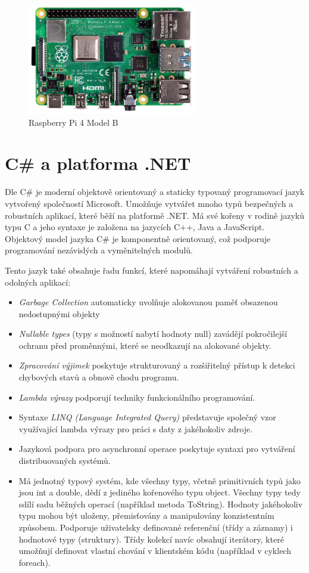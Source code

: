 \begin{figure}[hbt]
\centering
\includegraphics[width=0.66\textwidth]{obrazky-figures/raspberrypi.png}
\caption{Raspberry Pi 4 Model B}
\end{figure}

\section{C\# a platforma .NET}
Dle \cite{c_sharp} C\# je moderní objektově orientovaný a staticky typovaný programovací jazyk vytvořený společností Microsoft. Umožňuje vytvářet mnoho typů bezpečných a robustních aplikací, které běží na platformě .NET. Má své kořeny v rodině jazyků typu C a jeho syntaxe je založena na jazycích C++, Java a JavaScript. Objektový model jazyka C\# je komponentně orientovaný, což podporuje programování nezávislých a vyměnitelných modulů.

Tento jazyk také obsahuje řadu funkcí, které napomáhají vytváření robustních a odolných aplikací:

\begin{itemize}
    \item {\it Garbage Collection} automaticky uvolňuje alokovanou paměť obsazenou nedostupnými objekty
    \item {\it Nullable types} (typy s možností nabytí hodnoty null) zavádějí pokročilejší ochranu před proměnnými, které se neodkazují na alokované objekty.
    \item {\it Zpracování výjimek} poskytuje strukturovaný a rozšiřitelný přístup k detekci chybových stavů a obnově chodu programu.
    \item {\it Lambda výrazy} podporují techniky funkcionálního programování.
    \item Syntaxe {\it LINQ (Language Integrated Query)} představuje společný vzor využívající lambda výrazy pro práci s daty z jakéhokoliv zdroje.
    \item Jazyková podpora pro asynchronní operace poskytuje syntaxi pro vytváření distribuovaných systémů.
    \item Má jednotný typový systém, kde všechny typy, včetně primitivních typů jako jsou int a double, dědí z jediného kořenového typu object. Všechny typy tedy sdílí sadu běžných operací (například metoda ToString). Hodnoty jakéhokoliv typu mohou být uloženy, přemisťovány a manipulovány konzistentním způsobem. Podporuje uživatelsky definované referenční (třídy a záznamy) i hodnotové typy (struktury). Třídy kolekcí navíc obsahují iterátory, které umožňují definovat vlastní chování v klientském kódu (například v cyklech foreach).
\end{itemize}

